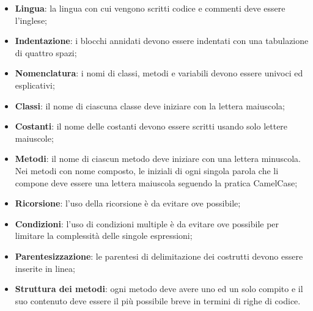 \begin{itemize}
	\item \textbf{Lingua}: la lingua con cui vengono scritti codice e commenti deve essere l'inglese;
	\item \textbf{Indentazione}: i blocchi annidati devono essere indentati con una tabulazione di quattro spazi;
	\item \textbf{Nomenclatura}: i nomi di classi, metodi e variabili devono essere univoci ed esplicativi;
	\item \textbf{Classi}: il nome di ciascuna classe deve iniziare con la lettera maiuscola; 
	\item \textbf{Costanti}: il nome delle costanti devono essere scritti usando solo lettere maiuscole;
	\item \textbf{Metodi}: il nome di ciascun metodo deve iniziare con una lettera minuscola. Nei metodi con nome composto, le iniziali di ogni singola parola che li compone deve essere una lettera maiuscola seguendo la pratica CamelCase\glo;
	\item \textbf{Ricorsione}: l'uso della ricorsione è da evitare ove possibile;
	\item \textbf{Condizioni}: l'uso di condizioni multiple è da evitare ove possibile per limitare la complessità delle singole espressioni\glo;
	\item \textbf{Parentesizzazione}: le parentesi di delimitazione dei costrutti devono essere inserite in linea;
	\item \textbf{Struttura dei metodi}: ogni metodo deve avere uno ed un solo compito e il suo contenuto deve essere il più possibile breve in termini di righe di codice.
\end{itemize}
